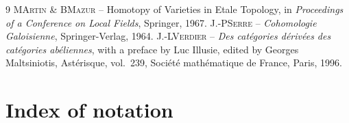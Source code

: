 \begin{thebibliography}{9}
{%
\textsc{M\ptbl Artin \& B\ptbl Mazur} -- {\og Homotopy of Varieties in Etale Topology\fg}, in \emph{Proceedings of a Conference on Local Fields}, Springer, 1967.
}
{%
\textsc{J.-P\ptbl Serre} -- \emph{Cohomologie Galoisienne}, Springer-Verlag, 1964.
}
{%
\textsc{J.-L\ptbl Verdier} -- \emph{Des cat\'egories d\'eriv\'ees des cat\'egories ab\'eliennes}, with a preface by Luc Illusie, edited by Georges Maltsiniotis, Ast\'erisque, vol.~239, Soci\'et\'e math\'ematique de France, Paris, 1996.
}
\end{thebibliography}

\chapter*{Index of notation}

